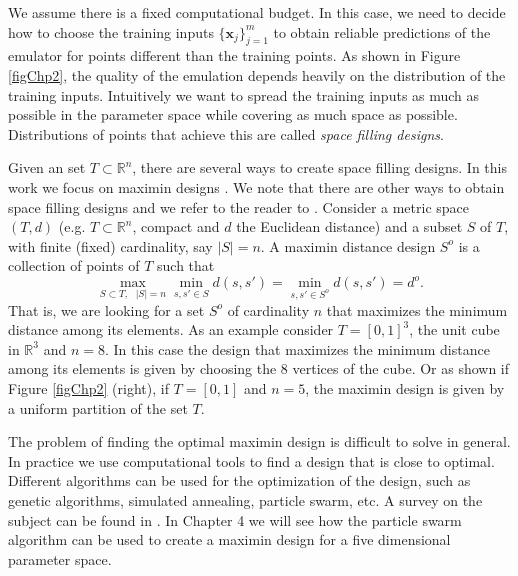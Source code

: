 \documentclass[12pt]{book}
\newcommand{\x}{\textbf{x}}
\begin{document}
We assume there is a fixed computational budget. In this case, we need to decide how
to choose the training inputs $\{\x_{j}\}_{j=1}^{m}$ to obtain reliable predictions 
of the emulator for points
different than the training points. As shown in Figure \ref{figChp2}, the quality
of the emulation depends heavily on the distribution of the training inputs. 
Intuitively we want to spread the training inputs as much as possible in the
parameter space while covering  as much space as possible. 
Distributions of points that achieve this are called \textit{space filling designs}.
 
Given an set $T\subset\mathbb{R}^{n}$, there are several ways to create space filling designs. 
In this work we focus on maximin designs
\cite{johnson1990minimax}. We note that there are other ways to obtain space filling
designs and we refer to the reader to  \cite{pronzato2012design}. Consider a metric space $(T,d)$ (e.g.
$T\subset\mathbb{R}^{n}$, compact and $d$ the Euclidean distance) and a subset $S$ of $T$, 
with finite (fixed) cardinality, say $|S|=n$.
A maximin distance design $S^{o}$ is a collection of points of $T$  such that
\begin{equation*}
\max_{S\subset T,\text{ }|S|=n}\min_{s,s'\in S}d(s,s')=\min_{s,s'\in S^{o}}d(s,s')=d^{o}.
\end{equation*}
That is, we are looking for a set $S^{o}$ of cardinality $n$ that maximizes the minimum distance among 
its elements. As an example consider $T=[0,1]^{3}$, the unit cube in $\mathbb{R}^{3}$ and $n=8$. In 
this case the design that maximizes the minimum distance among its elements is given by choosing
 the 8 vertices of the cube. Or as shown if Figure \ref{figChp2} (right), if $T=[0,1]$ and $n=5$, 
the maximin design is given by a uniform partition  of the set $T$.


The problem of finding
the optimal  maximin design is difficult to solve in general. In practice we use computational tools
to find a design that is close to optimal.  Different  algorithms can be used for the optimization
of the design, such as genetic algorithms, simulated annealing, particle swarm, etc. A survey
on the subject  can be found in 
\cite{viana2010algorithm}. In Chapter 4 we will see how  the particle swarm algorithm can be used to 
create a maximin design for a five dimensional parameter space.
\end{document}
